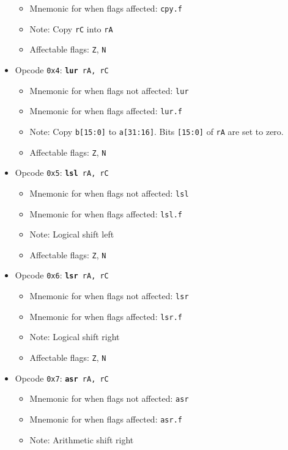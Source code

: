 \documentclass{article}
\begin{document}
\begin{itemize}
\begin{itemize}
			\item Mnemonic for when flags affected:  \texttt{cpy.f}
			\item Note:  Copy \texttt{rC} into \texttt{rA}
			\item Affectable flags:
				\texttt{Z}, \texttt{N}
		\end{itemize}
		\item Opcode \texttt{0x4}:
			\texttt{\textbf{lur} rA, rC}
		\begin{itemize}
			\item Mnemonic for when flags not affected:  \texttt{lur}
			\item Mnemonic for when flags affected:  \texttt{lur.f}
			\item Note:  Copy \texttt{b[15:0]} to \texttt{a[31:16]}.
			Bits \texttt{[15:0]} of \texttt{rA} are set to zero.
			\item Affectable flags:
				\texttt{Z}, \texttt{N}
		\end{itemize}
		\item Opcode \texttt{0x5}:
			\texttt{\textbf{lsl} rA, rC}
		\begin{itemize}
			\item Mnemonic for when flags not affected:  \texttt{lsl}
			\item Mnemonic for when flags affected:  \texttt{lsl.f}
			\item Note:  Logical shift left
			\item Affectable flags:
				\texttt{Z}, \texttt{N}
		\end{itemize}
		\item Opcode \texttt{0x6}:
			\texttt{\textbf{lsr} rA, rC}
		\begin{itemize}
			\item Mnemonic for when flags not affected:  \texttt{lsr}
			\item Mnemonic for when flags affected:  \texttt{lsr.f}
			\item Note:  Logical shift right
			\item Affectable flags:
				\texttt{Z}, \texttt{N}
		\end{itemize}
		\item Opcode \texttt{0x7}:
			\texttt{\textbf{asr} rA, rC}
		\begin{itemize}
			\item Mnemonic for when flags not affected:  \texttt{asr}
			\item Mnemonic for when flags affected:  \texttt{asr.f}
			\item Note:  Arithmetic shift right

\end{itemize}
\end{itemize}
\end{document}
